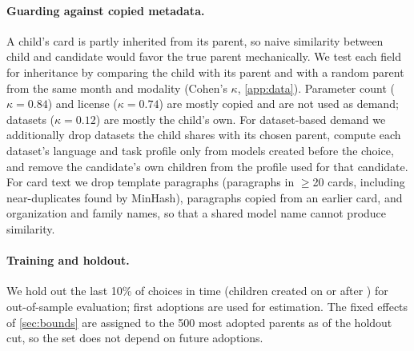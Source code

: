 \paragraph{Guarding against copied metadata.}
A child's card is partly inherited from its parent, so naive similarity between child and candidate would favor the
true parent mechanically. We test each field for inheritance by comparing the child with its parent and with a
random parent from the same month and modality (Cohen's $\kappa$, \cref{app:data}). Parameter count ($\kappa=0.84$)
and license ($\kappa=0.74$) are mostly copied and are not used as demand; datasets ($\kappa=0.12$) are mostly the
child's own. For dataset-based demand we additionally drop datasets the child shares with its chosen parent, compute
each dataset's language and task profile only from models created before the choice, and remove the candidate's own
children from the profile used for that candidate. For card text we drop template paragraphs (paragraphs in
$\ge$20 cards, including near-duplicates found by MinHash), paragraphs copied from an earlier card, and organization
and family names, so that a shared model name cannot produce similarity.

\paragraph{Training and holdout.}
We hold out the last 10\% of choices in time (children created on or after \tHold) for out-of-sample evaluation;
\nTrain{} first adoptions are used for estimation. The fixed effects of \cref{sec:bounds} are assigned to the 500
most adopted parents as of the holdout cut, so the set does not depend on future adoptions.
